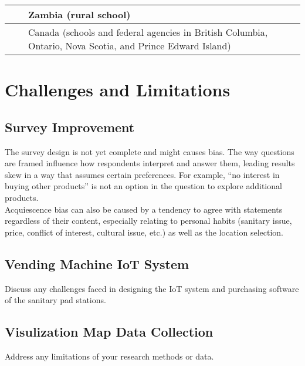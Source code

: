 \begin{table*}[ht]
\begin{tabular}{|p{}|p{}|p{}|}
                                                                      &                 & Zambia (rural school)                                                                                     \\ \hline
                                                                      &                 & Canada (schools and federal agencies in British Columbia, Ontario, Nova Scotia, and Prince Edward Island) \\ \hline
    \end{tabular}
    \label{table:free_menstrual_supplies}
\end{table*}

\section{Challenges and Limitations}

\subsection{Survey Improvement }
The survey design is not yet complete and might causes bias. The way questions are framed influence how respondents interpret and answer them, leading results skew in a way that assumes certain preferences. For example, “no interest in buying other products” is not an option in the question to explore additional products.\\

Acquiescence bias can also be caused by a tendency to agree with statements regardless of their content, especially relating to personal habits (sanitary issue, price, conflict of interest, cultural issue, etc.) as well as the location selection.

\subsection{Vending Machine IoT System}
Discuss any challenges faced in designing the IoT system and purchasing software of the sanitary pad stations.\\

\subsection{Visulization Map Data Collection }
Address any limitations of your research methods or data.

